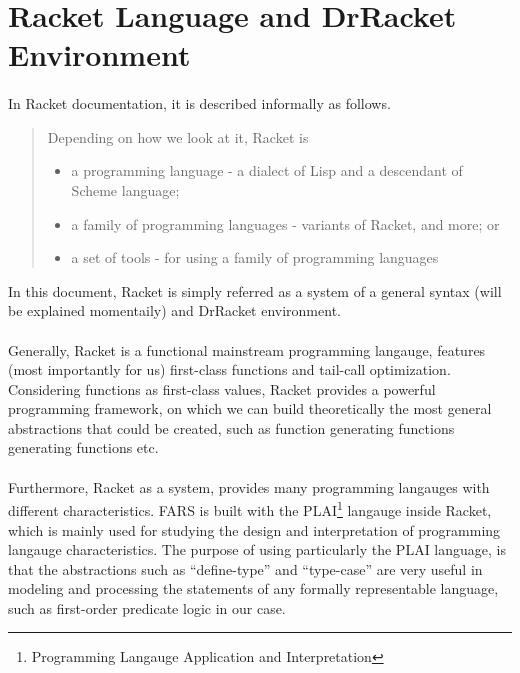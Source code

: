 \documentclass[11pt]{report}
\begin{document}
\section{Racket Language and DrRacket Environment}
\label{section:racketIntro}

\paragraph{} In Racket documentation, it is described informally as follows. 

\begin{quote}
Depending on how we look at it, Racket is

\begin{itemize}
 \item a programming language - a dialect of Lisp and a descendant of Scheme language;
 \item a family of programming languages - variants of Racket, and more; or
 \item a set of tools - for using a family of programming languages
\end{itemize}

\end{quote}

In this document, Racket is simply referred as a system of a general syntax (will be explained momentaily) and DrRacket environment. 

\paragraph{} Generally, Racket is a functional mainstream programming langauge, features (most importantly for us) first-class functions and tail-call optimization. Considering functions as first-class values, Racket provides a powerful programming framework, on which we can build theoretically the most general abstractions that could be created, such as function generating functions generating functions etc.

\paragraph{} Furthermore, Racket as a system, provides many programming langauges with different characteristics. FARS is built with the PLAI\footnote{Programming Langauge Application and Interpretation} langauge inside Racket, which is mainly used for studying the design and interpretation of programming langauge characteristics. The purpose of using particularly the PLAI language, is that the abstractions such as ``define-type'' and ``type-case'' are very useful in modeling and processing the statements of any formally representable language, such as first-order predicate logic in our case.
\end{document}
